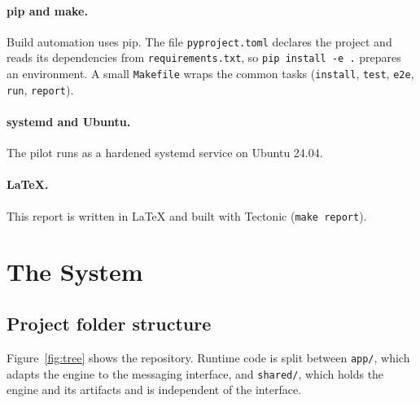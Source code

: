 \documentclass[11pt,a4paper]{article}
\begin{document}
\paragraph{pip and make.} Build automation uses pip. The file \texttt{pyproject.toml} declares the
project and reads its dependencies from \texttt{requirements.txt}, so \texttt{pip install -e .}
prepares an environment. A small \texttt{Makefile} wraps the common tasks (\texttt{install},
\texttt{test}, \texttt{e2e}, \texttt{run}, \texttt{report}).

\paragraph{systemd and Ubuntu.} The pilot runs as a hardened systemd service on Ubuntu 24.04.

\paragraph{LaTeX.} This report is written in LaTeX and built with Tectonic (\texttt{make report}).

\section{The System}\label{sec:system}

\subsection{Project folder structure}

Figure~\ref{fig:tree} shows the repository. Runtime code is split between \texttt{app/}, which adapts
the engine to the messaging interface, and \texttt{shared/}, which holds the engine and its artifacts
and is independent of the interface.
\end{document}
